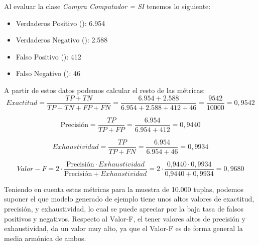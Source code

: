 Al evaluar la clase \textit{Compra Computador = SI} tenemos lo siguiente:

\begin{itemize}
	\item Verdaderos Positivo (): 6.954
	\item Verdaderos Negativo (): 2.588
	\item Falso Positivo (): 412
	\item Falso Negativo (): 46
\end{itemize}

A partir de estos datos podemos calcular el resto de las métricas:
\begin{equation*}
Exactitud = \frac{TP + TN}{TP + TN + FP + FN} = \frac{6.954 + 2.588}{6.954 + 2.588 + 412 + 46} = \frac{9542}{10000} = 0,9542
\end{equation*}

\begin{equation*}
\mbox{Precisión} = \frac{TP}{TP + FP} = \frac{6.954}{6.954 + 412} = 0,9440
\end{equation*}

\begin{equation*}
Exhaustividad = \frac{TP}{TP + FN} = \frac{6.954}{6.954 + 46} = 0,9934
\end{equation*}

\begin{equation*}
Valor-F = 2 \cdot \frac{\mbox{Precisión} \cdot Exhaustividad}{\mbox{Precisión} + Exhaustividad} 
		= 2 \cdot \frac{\mbox{0,9440} \cdot 0,9934}{\mbox{0,9440} + 0,9934}
		= 0,9680
\end{equation*}

Teniendo en cuenta estas métricas para la muestra de 10.000 tuplas, podemos suponer el que modelo generado de ejemplo tiene unos altos valores de exactitud, precisión, y exhaustividad, lo cual se puede apreciar por la baja tasa de falsos positivos y negativos. Respecto al Valor-F, el tener valores altos de precisión y exhaustividad, da un valor muy alto, ya que el Valor-F es de forma general la media armónica de ambos.

